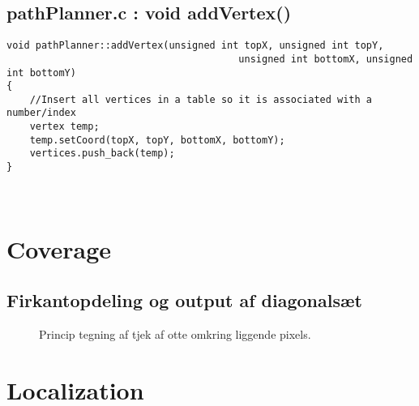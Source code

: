 \subsection{pathPlanner.c : void addVertex()}
\label{app:addVertex}
\begin{lstlisting}
void pathPlanner::addVertex(unsigned int topX, unsigned int topY, 
										unsigned int bottomX, unsigned int bottomY)
{
    //Insert all vertices in a table so it is associated with a number/index
    vertex temp;
    temp.setCoord(topX, topY, bottomX, bottomY);
    vertices.push_back(temp);
}
\end{lstlisting}~\\

\newpage
\section{Coverage}
\subsection{Firkantopdeling og output af diagonalsæt}
\label{app:firkant}

\begin{figure}[!th]
\centering
\begin{tikzpicture}[scale=0.95]

\end{tikzpicture}
\caption[tekst i indholdsfortegnelsen]{Princip tegning af tjek af otte omkring liggende pixels.}
\label{fig:principotte}
\end{figure}
\newpage
%


\newpage
\section{Localization}

